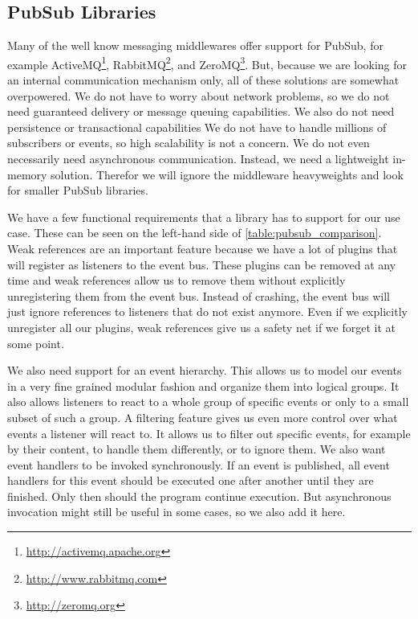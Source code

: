 \subsection{PubSub Libraries}
\label{implementation:selecting:pubsub}

Many of the well know messaging middlewares offer support for PubSub, for example ActiveMQ\footnote{\url{http://activemq.apache.org}}, RabbitMQ\footnote{\url{http://www.rabbitmq.com}}, and ZeroMQ\footnote{\url{http://zeromq.org}}.
But, because we are looking for an internal communication mechanism only, all of these solutions are somewhat overpowered.
We do not have to worry about network problems, so we do not need guaranteed delivery or message queuing capabilities.
We also do not need persistence or transactional capabilities
We do not have to handle millions of subscribers or events, so high scalability is not a concern.
We do not even necessarily need asynchronous communication.
Instead, we need a lightweight in-memory solution.
Therefor we will ignore the middleware heavyweights and look for smaller PubSub libraries.

We have a few functional requirements that a library has to support for our use case.
These can be seen on the left-hand side of \autoref{table:pubsub_comparison}.
Weak references are an important feature because we have a lot of plugins that will register as listeners to the event bus.
These plugins can be removed at any time and weak references allow us to remove them without explicitly unregistering them from the event bus.
Instead of crashing, the event bus will just ignore references to listeners that do not exist anymore.
Even if we explicitly unregister all our plugins, weak references give us a safety net if we forget it at some point.

We also need support for an event hierarchy.
This allows us to model our events in a very fine grained modular fashion and organize them into logical groups.
It also allows listeners to react to a whole group of specific events or only to a small subset of such a group.
A filtering feature gives us even more control over what events a listener will react to.
It allows us to filter out specific events, for example by their content, to handle them differently, or to ignore them.
We also want event handlers to be invoked synchronously.
If an event is published, all event handlers for this event should be executed one after another until they are finished.
Only then should the program continue execution.
But asynchronous invocation might still be useful in some cases, so we also add it here.

